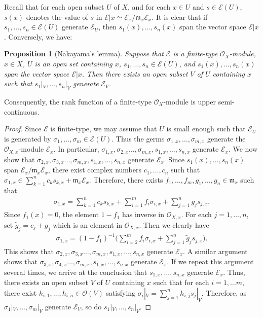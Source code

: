 \documentclass[12pt,a4paper,notitlepage]{report}
\theoremstyle{definition}
\theoremstyle{plain}
\newtheorem{pp}[df]{Proposition}
\newcommand{\fk}{\mathfrak}
\newcommand{\wtd}{\widetilde}
\newcommand{\scr}{\mathscr}
\numberwithin{equation}{section}
\begin{document}
Recall that for each open subset $U$ of $X$, and for each  $x\in U$ and $s\in\scr E(U)$, $s(x)$ denotes the value of $s$ in $\scr E|x\simeq \scr E_x/\fk m_x\scr E_x$. It is clear that if $s_1,\dots,s_n\in\scr E(U)$ generate $\scr E_U$, then $s_1(x),\dots,s_n(x)$ span the vector space $\scr E|x$. Conversely, we have:

\begin{pp}[Nakayama's lemma]\label{lb60}
Suppose that $\scr E$ is a finite-type $\scr O_X$-module, $x\in X$, $U$ is an open set containing $x$, $s_1,\dots,s_n\in\scr E(U)$, and $s_1(x),\dots,s_n(x)$ span the vector space $\scr E|x$. Then there exists an open subset $V$ of $U$ containing $x$ such that $s_1|_V,\dots,s_n|_V$ generate $\scr E_V$. 
\end{pp}

Consequently, the rank function of a finite-type $\scr O_X$-module is upper semi-continuous.

\begin{proof}
Since $\scr E$ is  finite-type, we may assume that $U$ is small enough such that $\scr E_U$ is generated  by $\sigma_1,\dots,\sigma_m\in\scr E(U)$. Thus the germs $\sigma_{1,x},\dots,\sigma_{m,x}$ generate the $\scr O_{X,x}$-module $\scr E_x$. In particular, $\sigma_{1,x},\sigma_{2,x}\dots,\sigma_{m,x},s_{1,x},\dots,s_{n,x}$ generate $\scr E_x$. We now show that $\sigma_{2,x},\sigma_{3,x}\dots,\sigma_{m,x},s_{1,x},\dots,s_{n,x}$ generate $\scr E_x$. Since $s_1(x),\dots,s_n(x)$ span $\scr E_x/\fk m_x\scr E_x$, there exist complex numbers $c_1,\dots,c_n$ such that $\sigma_{1,x}\in\sum_{k=1}^n c_ks_{k,x}+\fk m_x\scr E_x$. Therefore, there exists $f_1,\dots,f_m,g_1,\dots,g_n\in\fk m_x$ such that
\begin{align*}
\sigma_{1,x}=\sum_{k=1}^n c_ks_{k,x}+\sum_{i=1}^m f_i\sigma_{i,x}+\sum_{j=1}^n g_j s_{j,x}.
\end{align*}
Since $f_1(x)=0$, the element $1-f_1$ has inverse  in $\scr O_{X,x}$. For each $j=1,\dots,n$, set $\wtd g_j=c_j+g_j$ which is an element in $\scr O_{X,x}$. Then we clearly have
\begin{align*}
\sigma_{1,x}=(1-f_1)^{-1}\bigg(\sum_{i=2}^m f_i\sigma_{i,x}+\sum_{j=1}^n \wtd g_j s_{j,x}  \bigg).
\end{align*}
This shows that $\sigma_{2,x},\sigma_{3,x}\dots,\sigma_{m,x},s_{1,x},\dots,s_{n,x}$ generate $\scr E_x$. A similar argument shows that $\sigma_{3,x},\sigma_{4,x}\dots,\sigma_{m,x},s_{1,x},\dots,s_{n,x}$ generate $\scr E_x$. If we repeat this argument several times, we arrive at the conclusion that $s_{1,x},\dots,s_{n,x}$ generate $\scr E_x$. Thus, there exists an open subset $V$ of $U$ containing $x$ such that for each $i=1,\dots m$, there exist $h_{i,1},\dots,h_{i,n}\in\scr O(V)$ satisfying $\sigma_i|_V=\sum_{j=1}^n h_{i,j} s_j|_V$. Therefore, as $\sigma_1|_V,\dots,\sigma_m|_V$ generate  $\scr E_V$, so do $s_1|_V,\dots,s_n|_V$.
\end{proof}
\end{document}
